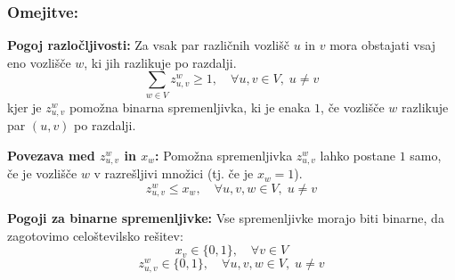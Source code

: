 \documentclass[a4paper,12pt]{article}
\theoremstyle{definition}
\theoremstyle{remark}
\theoremstyle{definition}
\begin{document}
\subsubsection*{Omejitve:}

\textbf{Pogoj razločljivosti:}
   Za vsak par različnih vozlišč $u$ in $v$ mora obstajati vsaj eno vozlišče $w$, ki jih razlikuje po razdalji.
   \begin{equation*}
   \sum_{w \in V} z_{u,v}^w \geq 1, \quad \forall u, v \in V, \; u \neq v
   \end{equation*}
   kjer je $z_{u,v}^w$ pomožna binarna spremenljivka, ki je enaka $1$, če vozlišče $w$ razlikuje par $(u, v)$ po razdalji.

\noindent
\textbf{Povezava med $z_{u,v}^w$ in $x_w$:}
   Pomožna spremenljivka $z_{u,v}^w$ lahko postane $1$ samo, če je vozlišče $w$ v razrešljivi množici (tj. če je $x_w = 1$). 
   \begin{equation*}
   z_{u,v}^w \leq x_w, \quad \forall u, v, w \in V, \; u \neq v
   \end{equation*}

\noindent
\textbf{Pogoji za binarne spremenljivke:}
    Vse spremenljivke morajo biti binarne, da zagotovimo celoštevilsko rešitev:
   \begin{equation*}
   x_v \in \{0, 1\}, \quad \forall v \in V
   \end{equation*}
   \begin{equation*}
   z_{u,v}^w \in \{0, 1\}, \quad \forall u, v, w \in V, \; u \neq v
   \end{equation*}
\end{document}

